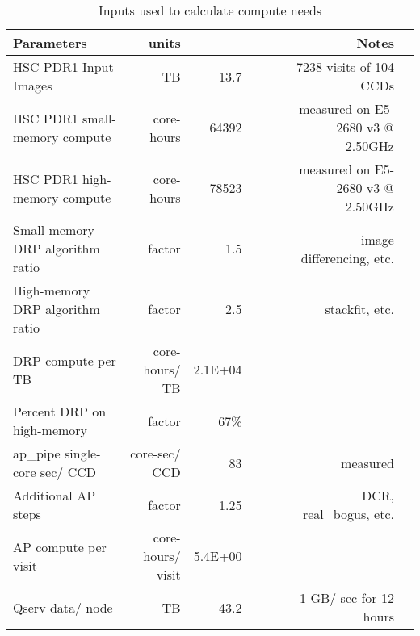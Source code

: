 \tiny \begin{longtable} { |p{}  |r  |r  |r  |r  |r  |r  |r |} 
\caption{Inputs used to calculate compute needs \label{tab:computeSizing}}\\ 
\hline 
\textbf{Parameters}&\textbf{units}&\textbf{}&\textbf{}&\textbf{}&\textbf{}&\textbf{Notes} \\ \hline
{HSC PDR1 Input Images}&{TB}&{13.7}&{}&{}&{}&{7238 visits of 104 CCDs} \\ \hline
{HSC PDR1 small-memory compute}&{core-hours}&{64392}&{}&{}&{}&{measured on E5-2680 v3 @ 2.50GHz} \\ \hline
{HSC PDR1 high-memory compute}&{core-hours}&{78523}&{}&{}&{}&{measured on E5-2680 v3 @ 2.50GHz} \\ \hline
{Small-memory DRP algorithm ratio}&{factor}&{1.5}&{}&{}&{}&{image differencing, etc.} \\ \hline
{High-memory DRP algorithm ratio}&{factor}&{2.5}&{}&{}&{}&{stackfit, etc.} \\ \hline
{DRP compute per TB}&{core-hours/ TB}&{2.1E+04}&&&& \\ \hline
{Percent DRP on high-memory}&{factor}&{67\%}&&&& \\ \hline
{ap\_pipe single-core sec/ CCD}&{core-sec/ CCD}&{83}&{}&{}&{}&{measured} \\ \hline
{Additional AP steps}&{factor}&{1.25}&{}&{}&{}&{DCR, real\_bogus, etc.} \\ \hline
{AP compute per visit}&{core-hours/ visit}&{5.4E+00}&&&& \\ \hline
{Qserv data/ node}&{TB}&{43.2}&{}&{}&{}&{1 GB/ sec for 12 hours} \\ \hline
\end{longtable} \normalsize
